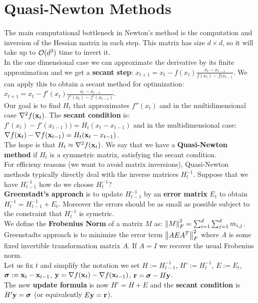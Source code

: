 \section{Quasi-Newton Methods}
The main computational bottleneck in Newton’s method is the computation and inversion of the Hessian matrix in each step. This matrix has size $d \times d$, so it will take up to $\mathcal{O}(d^3)$ time to invert it. \\
In the one dimensional case we can approximate the derivative by its finite approximation and we get a \textbf{secant step}: $x_{t+1} = x_t - f(x_t)\frac{x_t - x_{t-1}}{f(x_t) - f(x_{t-1}}$. We can apply this to obtain a secant method for optimization: $x_{t+1} = x_t - f'(x_t) \frac{x_t - x_{t-1}}{f'(x_t) - f'(x_{t-1})}$. \\
Our goal is to find $H_t$ that approximates $f''(x_t)$ and in the multidimensional case $\nabla^2 f(\mathbf{x}_t)$. The \textbf{secant condition} is: $f'(x_t) - f'(x_{t-1})) = H_t (x_t - x_{t-1})$ and in the multidimensional case: $\nabla f(\mathbf{x}_t) - \nabla f(\mathbf{x}_{t-1}) = H_t(\mathbf{x}_t - x_{t-1})$. \\
The hope is that $H_t \approx \nabla^2 f(\mathbf{x}_t)$. We say that we have a \textbf{Quasi-Newton method} if $H_t$ is a symmetric matrix, satisfying the secant condition. \\
For efficieny reasons (we want to avoid matrix inversions), Quasi-Newton methods typically directly deal with the inverse matrices $H_t^{-1}$. Suppose that we have $H_{t-1}^{-1}$ how do we choose $H_t^{-1}$? \\
\textbf{Greenstadt's approach} is to update $H_{t-1}^{-1}$ by an \textbf{error matrix} $E_t$ to obtain $H_t^{-1} = H_{t-1}^{-1} + E_t$. Moreover the errors should be as small as possible subject to the constraint that $H_t^{-1}$ is symetric. \\
We define the \textbf{Frobenius Norm} of a matrix $M$ as: $\norm{M}_F^2 = \sum_{i=1}^d{\sum_{j=1}^d{m_{i, j}}}$. \\
Greenstadts approach is to minimize the error term $\norm{AEA^T}_F^2$ where $A$ is some fixed invertible transformation matrix $A$. If $A = I$ we recover the usual Frobenius norm. \\
Let us fix $t$ and simplify the notation we set $H := H_{t-1}^{-1}$, $H' := H_t^{-1}$, $E := E_t$, $\boldsymbol{\sigma} := \mathbf{x}_t - \mathbf{x}_{t-1}$, $\mathbf{y} = \nabla f(\mathbf{x}_t) - \nabla f(\mathbf{x}_{t-1})$, $\mathbf{r} = \boldsymbol{\sigma} - H \mathbf{y}$. \\
The new \textbf{update formula} is now $H' = H + E$ and the \textbf{secant condition} is $H'\mathbf{y} = \boldsymbol{\sigma}$ (or equivalently $E \mathbf{y} = \mathbf{r}$).
